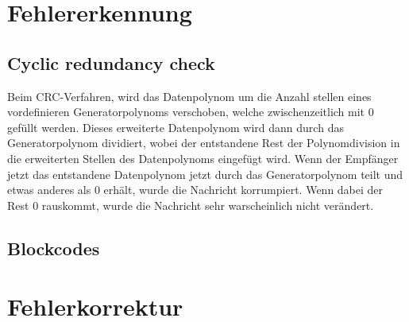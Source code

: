 \documentclass{article}
\begin{document}
\section{Fehlererkennung}
\subsection{Cyclic redundancy check}
Beim CRC-Verfahren, wird das Datenpolynom um die Anzahl stellen eines vordefinieren Generatorpolynoms verschoben, welche zwischenzeitlich mit 0 gefüllt werden. Dieses erweiterte Datenpolynom wird dann durch das Generatorpolynom dividiert, wobei der entstandene Rest der Polynomdivision in die erweiterten Stellen des Datenpolynoms eingefügt wird. Wenn der Empfänger jetzt das entstandene Datenpolynom jetzt durch das Generatorpolynom teilt und etwas anderes als 0 erhält, wurde die Nachricht korrumpiert. Wenn dabei der Rest 0 rauskommt, wurde die Nachricht sehr warscheinlich nicht verändert.
\subsection{Blockcodes}
\section{Fehlerkorrektur}
\end{document}

